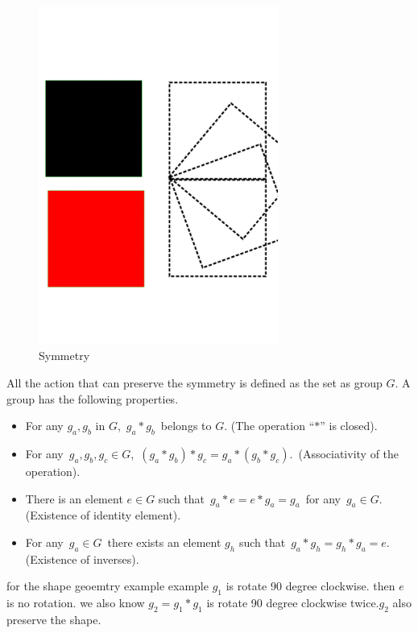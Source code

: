 \begin{figure}[!htbp]
  \begin{center}
      \includegraphics[width=0.7\textwidth]{Symmetry}
    \caption{Symmetry}
    \label{fig:symmetry}
\end{center}
\end{figure}


All the action that can preserve the symmetry is defined as the set as group $G$.
A group has the following properties.
\begin{itemize}
\item For any $g_a,g_b$ in $G$, \,$g_a*g_b$\, belongs to $G$. (The operation
``$*$'' is closed).

\item For any \,$g_a,g_b,g_c\in G$, \,$(g_a*g_b)*g_c=g_a*(g_b*g_c)$. \,(Associativity of
the operation).

\item There is an element $e\in G$ such that \,$g_a*e=e*g_a=g_a$\, for any
\,$g_a\in G$. (Existence of identity element).

\item For any \,$g_a\in G$\, there exists an element $g_h$ such that
\,$g_a*g_h=g_h*g_a=e$. \,(Existence of inverses).
\end{itemize}

for the shape geoemtry example example $g_1$ is rotate 90 degree clockwise. then $e$ is no rotation.
we also know $g_2=g_1*g_1$ is rotate 90 degree clockwise twice.$g_2$ also preserve the shape.


